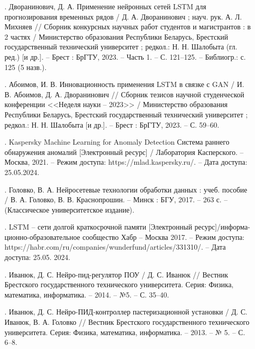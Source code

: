 {\begin{itemize}[leftmargin=2.15cm, labelwidth=0.65cm, labelsep=0.0cm]
    \item[\theimagecntr.] Дворанинович, Д. А. Применение нейронных сетей LSTM для прогнозирования временных рядов / Д. А. Дворанинович ; науч. рук. А. Л. Михняев // Сборник конкурсных научных работ студентов и магистрантов : в 2 частях / Министерство образования Республики Беларусь, Брестский государственный технический университет ; редкол.: Н. Н. Шалобыта (гл. ред.) [и др.]. {--} Брест : БрГТУ, 2023. {--} Часть 1. {--} С. 121–125. – Библиогр.: с. 125 (5 назв.).
    \addtocounter{imagecntr}{1}

    \item[\theimagecntr.] Абоимов, И. В. Инновационность применения LSTM в связке с GAN / И. В. Абоимов, Д. А. Дворанинович // Сборник тезисов научной студенческой конференции <<Неделя науки {--} 2023>> / Министерство образования Республики Беларусь, Брестский государственный технический университет ; редкол.: Н. Н. Шалобыта [и др.]. {--} Брест : БрГТУ, 2023. {--} С. 59–60.
    \addtocounter{imagecntr}{1}

    \item[\theimagecntr.] Kaspersky Machine Learning for Anomaly Detection Система раннего обнаружения аномалий [Электронный ресурс] / Лаборатория Касперского. {--} Москва, 2021. {--} Режим доступа: https://mlad.kaspersky.ru/. – Дата доступа: 25.05.2024.
    \addtocounter{imagecntr}{1}

    \item[\theimagecntr.] Головко, В. А. Нейросетевые технологии обработки данных : учеб. пособие / В. А. Головко, В. В. Краснопрошин. {--} Минск : БГУ, 2017. {--} 263 с. {--} (Классическое университетское издание).
    \addtocounter{imagecntr}{1}

    \item[\theimagecntr.] LSTM {--} сети долгой краткосрочной памяти [Электронный ресурс]/информа- ционно-образовательное сообщество Хабр {--} Москва 2017. {--} Режим доступа: https://habr.com/ru/companies/wunderfund/articles/331310/. {--} Дата доступа: 25.05. 2024.
    \addtocounter{imagecntr}{1}
    
    \item[\theimagecntr.] Иванюк, Д. С. Нейро-пид-регулятор ПОУ / Д. С. Иванюк // Вестник Брестского государственного технического университета. Серия: Физика, математика, информатика. {--} 2014. {--} №5. {--} С. 35–40.
    \addtocounter{imagecntr}{1}
    
    \item[\theimagecntr.] Иванюк, Д. С. Нейро-ПИД-контроллер пастеризационной установки / Д. С. Иванюк, В. А. Головко // Вестник Брестского государственного технического университета. Серия: Физика, математика, информатика. {--} 2013. {--} № 5. {--} С. 6–8.
    \addtocounter{imagecntr}{1}
    

\end{itemize}}
